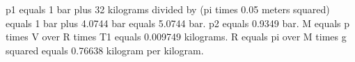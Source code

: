 p1 equals 1 bar plus 32 kilograms divided by (pi times 0.05 meters squared) equals 1 bar plus 4.0744 bar equals 5.0744 bar. p2 equals 0.9349 bar. M equals p times V over R times T1 equals 0.009749 kilograms. R equals pi over M times g squared equals 0.76638 kilogram per kilogram.